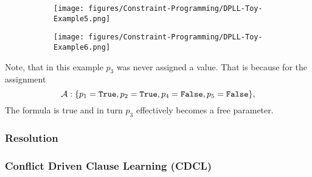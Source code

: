 \begin{figure}[H]
    \centering
    \begin{subfigure}[t]{0.45\textwidth}
        \centering
        \texttt{[image: figures/Constraint-Programming/DPLL-Toy-Example5.png]}
    \end{subfigure}
    \begin{subfigure}[t]{0.45\textwidth}
        \centering
        \texttt{[image: figures/Constraint-Programming/DPLL-Toy-Example6.png]}
    \end{subfigure}
\end{figure}
Note, that in this example \(p_3\) was never assigned a value. That is because for the assignment
\begin{equation*}
    \mathcal{A}: \{ p_1 = \text{\texttt{True}}, p_2 = \text{\texttt{True}}, p_4 = \text{\texttt{False}}, p_5 = \text{\texttt{False}} \},
\end{equation*} 
The formula is true and in turn \(p_3\) effectively becomes a free parameter.

\subsubsection{Resolution}

\subsubsection{Conflict Driven Clause Learning (CDCL)}